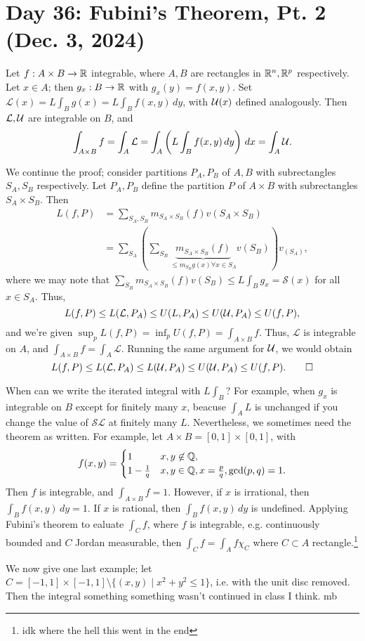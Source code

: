 \section{Day 36: Fubini's Theorem, Pt. 2 (Dec. 3, 2024)}
\begin{simplethm}
    Let $f : A \times B \to \mathbb R$ integrable, where $A, B$ are rectangles in $\mathbb R^n, \mathbb R^p$ respectively. Let $x \in A$; then $g_x : B \to \mathbb R$ with $g_x(y) = f(x, y)$. Set $\mathcal{L}(x) = L \int_B g(x) = L \int_B f(x, y) \, dy$, with $\mathcal U(x)$ defined analogously. Then $\mathcal{L}, \mathcal U$ are integrable on $B$, and
    \[ \int_{A \times B} f = \int_A \mathcal{L} = \int_A \left(L \int_B f(x, y) \, dy \right) \, dx = \int_A \mathcal U. \]
\end{simplethm}
\noindent We continue the proof; consider partitions $P_A, P_B$ of $A, B$ with subrectangles $S_A, S_B$ respectively. Let $P_A, P_B$ define the partition $P$ of $A \times B$ with subrectangles $S_A \times S_B$. Then
\begin{align*}
    L(f, P) &= \sum_{S_A, S_B} m_{S_A \times S_B}(f) v(S_A \times S_B) \\
    &= \sum_{S_A} \left( \sum_{S_B} \underbrace{m_{S_A \times S_B}(f)}_{\leq m_{S_B} g(x) \forall x \in S_A} v(S_B) \right) v_(S_A),
\end{align*}
where we may note that $\sum_{S_B} m_{S_A \times S_B}(f) v(S_B) \leq L \int_B g_x = \mathcal{S}(x)$ for all $x \in S_A$. Thus,
\[ L(f, P) \leq L(\mathcal{L}, P_A) \leq U(L, P_A) \leq U(\mathcal U, P_A) \leq U(f, P), \]
and we're given $\sup_p L(f, P) = \inf_p U(f, P) = \int_{A \times B} f$. Thus, $\mathcal{L}$ is integrable on $A$, and $\int_{A \times B} f = \int_A \mathcal{L}$. Running the same argument for $\mathcal U$, we would obtain
\[ L(f, P) \leq L(\mathcal{L}, P_A) \leq L(\mathcal U, P_A) \leq U(\mathcal U, P_A) \leq U(f, P). \qed \]
\begin{remark}
    When can we write the iterated integral with $L \int_B$? For example, when $g_x$ is integrable on $B$ except for finitely many $x$, beacuse $\int_A L$ is unchanged if you change the value of $\mathcal{SL}$ at finitely many $L$. Nevertheless, we sometimes need the theorem as written. For example, let $A \times B = [0, 1] \times [0, 1]$, with
    \[ f(x, y) = \begin{cases} 1 & x, y \not\in \mathbb Q, \\ 1 - \frac{1}{q} & x, y \in \mathbb Q, x = \frac{p}{q}, \gcd(p, q) = 1. \end{cases} \]
    Then $f$ is integrable, and $\int_{A \times B} f = 1$. However, if $x$ is irrational, then $\int_B f(x, y) \, dy = 1$. If $x$ is rational, then $\int_B f(x, y) \, dy$ is undefined. Applying Fubini's theorem to ealuate $\int_{C} f$, where $f$ is integrable, e.g. continuously bounded and $C$ Jordan measurable, then $\int_C f = \int_A f \chi_C$ where $C \subset A$ rectangle.\footnote{idk where the hell this went in the end}
\end{remark}
We now give one last example; let $C = [-1, 1] \times [-1, 1] \setminus \{(x, y) \mid x^2 + y^2 \leq 1\}$, i.e. with the unit disc removed. Then the integral something something wasn't continued in class I think. mb